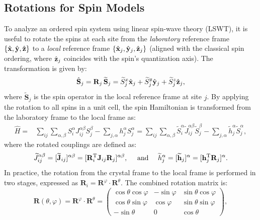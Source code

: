 \documentclass[aps, prx, nofootinbib, superscriptaddress]{revtex4-2}
\begin{document}
\subsection{Rotations for Spin Models}
To analyze an ordered spin system using linear spin-wave theory (LSWT), it is useful to rotate the spins at each site from the \emph{laboratory} reference frame $\{\hat{\bf x}, \hat{\bf y}, \hat{\bf z}\}$ to a \emph{local} reference frame $\{\hat{\bf x}_{j}, \hat{\bf y}_{j}, \hat{\bf z}_{j}\}$ (aligned with the classical spin ordering, where $\hat{{\bf z}}_{j}$ coincides with the spin's quantization axis). 
The transformation is given by:
\begin{equation}
    \label{eq: Spin rotation}
    \hat{\bf S}_j = \mathbf{R}_j \, \widetilde{\mathbf{S}}_j 
    = \widetilde{S}^{x}_{j} \hat{\bf x}_{j} + \widetilde{S}^{y}_{j} \hat{\bf y}_{j} + \widetilde{S}^{z}_{j} \hat{\bf z}_{j},
\end{equation}
where $\widetilde{\mathbf{S}}_j$ is the spin operator in the local reference frame at site $j$.
By applying the rotation to all spins in a unit cell, the spin Hamiltonian is transformed from the laboratory frame to the local frame as:
\begin{equation}\label{eq: Rotated Hamiltonian}
    \begin{split}
        \hat{H} = & \sum_{ij} \sum_{\alpha, \beta} S^{\alpha}_{i} J_{ij}^{\alpha\beta} S^{\beta}_{j} - \sum_{j, \alpha} h_{j}^{\alpha} S^{\alpha}_{j}
        = \sum_{ij} \sum_{\alpha, \beta} \widetilde{S}^{\alpha}_{i} \widetilde{J}_{ij}^{\alpha\beta} \widetilde{S}^{\beta}_{j} - \sum_{j, \alpha} \widetilde{h}_{j}^{\alpha} \widetilde{S}^{\alpha}_{j},
    \end{split}
\end{equation}
where the rotated couplings are defined as:
\begin{equation}
    \widetilde{J}_{ij}^{\alpha\beta}  = [\widetilde{\mathbf{J}}_{ij}]^{\alpha\beta} = [\mathbf{R}_i^{\rm T} \mathbf{J}_{ij} \mathbf{R}_j]^{\alpha\beta}, 
    \quad \text{ and } \quad
     \widetilde{h}_{j}^{\alpha} = [\widetilde{\mathbf{h}}_j]^{\alpha} = [\mathbf{h}_{j}^{\rm T} \mathbf{R}_{j}]^{\alpha}.
\end{equation}
In practice, the rotation from the crystal frame to the local frame is performed in two stages, expressed as $\mathbf{R}_i = \mathbf{R}^{\varphi} \cdot \mathbf{R}^{\theta}$. The combined rotation matrix is:
\begin{equation}
    \mathbf{R} (\theta, \varphi) = \mathbf{R}^{\varphi} \cdot \mathbf{R}^{\theta} = 
    \begin{pmatrix} 
        \cos \theta \cos \varphi & -\sin \varphi & \sin \theta \cos \varphi \\
        \cos \theta \sin \varphi & \cos \varphi & \sin \theta \sin \varphi \\
        -\sin \theta & 0 & \cos \theta
    \end{pmatrix},
    \label{eq_frametransform_gen}
\end{equation}
\end{document}
